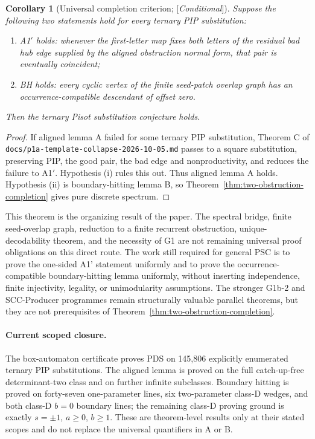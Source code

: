 \documentclass[11pt]{amsart}
\theoremstyle{plain}
\newtheorem{corollary}[theorem]{Corollary}
\theoremstyle{definition}
\theoremstyle{remark}
\newcommand{\Status}[1]{\textup{[\textit{#1}]}}
\begin{document}
\begin{corollary}[Universal completion criterion; \Status{Conditional}]\label{cor:universal-completion}
Suppose the following two statements hold for every ternary PIP substitution:
\begin{enumerate}[label=\textup{(\roman*)},leftmargin=*]
\item A1$'$ holds: whenever the first-letter map fixes both letters of the
residual bad hub edge supplied by the aligned obstruction normal form, that
pair is eventually coincident;
\item BH holds: every cyclic vertex of the finite seed-patch overlap graph has
an occurrence-compatible descendant of offset zero.
\end{enumerate}
Then the ternary Pisot substitution conjecture holds.
\end{corollary}
\begin{proof}
If aligned lemma A failed for some ternary PIP substitution, Theorem C of
\texttt{docs/p1a-template-collapse-2026-10-05.md} passes to a square
substitution, preserving PIP, the good pair, the bad edge and nonproductivity,
and reduces the failure to A1$'$.  Hypothesis (i) rules this out.  Thus aligned
lemma A holds.  Hypothesis (ii) is boundary-hitting lemma B, so
Theorem~\ref{thm:two-obstruction-completion} gives pure discrete spectrum.
\end{proof}

This theorem is the organizing result of the paper.  The spectral bridge,
finite seed-overlap graph, reduction to a finite recurrent obstruction,
unique-decodability theorem, and the necessity of G1 are not remaining
universal proof obligations on this direct route.  The work still required
for general PSC is to prove the one-sided A1' statement uniformly and to prove
the occurrence-compatible boundary-hitting lemma uniformly, without inserting
independence, finite injectivity, legality, or unimodularity assumptions.
The stronger G1b-2 and SCC-Producer programmes remain structurally valuable
parallel theorems, but they are not prerequisites of
Theorem~\ref{thm:two-obstruction-completion}.

\paragraph{Current scoped closure.}
The box-automaton certificate proves PDS on 145,806 explicitly enumerated
ternary PIP substitutions.  The aligned lemma is proved on the full
catch-up-free determinant-two class and on further infinite subclasses.
Boundary hitting is proved on forty-seven one-parameter lines, six
two-parameter class-D wedges, and both class-D $b=0$ boundary lines; the
remaining class-D proving ground is exactly $s=\pm1$, $a\ge0$, $b\ge1$.
These are theorem-level results only at their stated scopes and do not replace
the universal quantifiers in A or B.
\end{document}
